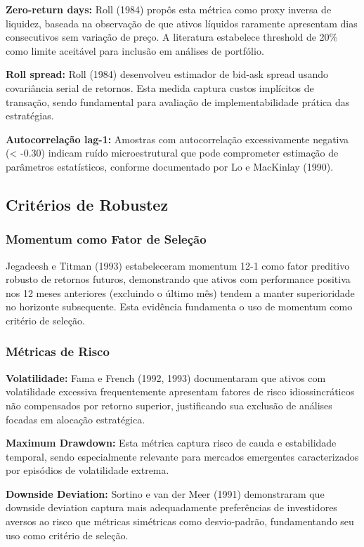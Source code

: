 \textbf{Zero-return days:} Roll (1984) propôs esta métrica como proxy inversa de liquidez, baseada na observação de que ativos líquidos raramente apresentam dias consecutivos sem variação de preço. A literatura estabelece threshold de 20\% como limite aceitável para inclusão em análises de portfólio.

\textbf{Roll spread:} Roll (1984) desenvolveu estimador de bid-ask spread usando covariância serial de retornos. Esta medida captura custos implícitos de transação, sendo fundamental para avaliação de implementabilidade prática das estratégias.

\textbf{Autocorrelação lag-1:} Amostras com autocorrelação excessivamente negativa (< -0.30) indicam ruído microestrutural que pode comprometer estimação de parâmetros estatísticos, conforme documentado por Lo e MacKinlay (1990).

\subsection{Critérios de Robustez}

\subsubsection{Momentum como Fator de Seleção}

Jegadeesh e Titman (1993) estabeleceram momentum 12-1 como fator preditivo robusto de retornos futuros, demonstrando que ativos com performance positiva nos 12 meses anteriores (excluindo o último mês) tendem a manter superioridade no horizonte subsequente. Esta evidência fundamenta o uso de momentum como critério de seleção.

\subsubsection{Métricas de Risco}

\textbf{Volatilidade:} Fama e French (1992, 1993) documentaram que ativos com volatilidade excessiva frequentemente apresentam fatores de risco idiossincráticos não compensados por retorno superior, justificando sua exclusão de análises focadas em alocação estratégica.

\textbf{Maximum Drawdown:} Esta métrica captura risco de cauda e estabilidade temporal, sendo especialmente relevante para mercados emergentes caracterizados por episódios de volatilidade extrema.

\textbf{Downside Deviation:} Sortino e van der Meer (1991) demonstraram que downside deviation captura mais adequadamente preferências de investidores aversos ao risco que métricas simétricas como desvio-padrão, fundamentando seu uso como critério de seleção.


